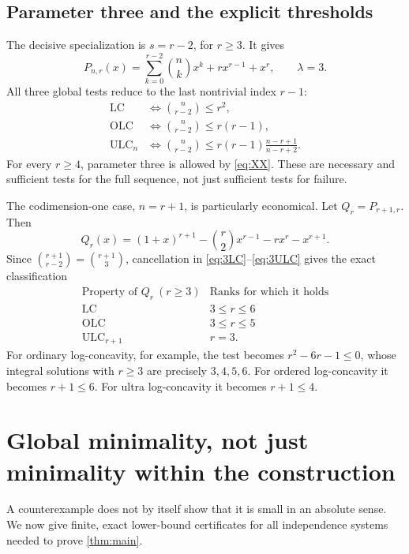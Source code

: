 \documentclass[11pt,letterpaper]{article}
\numberwithin{equation}{section}
\theoremstyle{definition}
\theoremstyle{remark}
\newcommand{\LC}{\mathrm{LC}}
\newcommand{\OLC}{\mathrm{OLC}}
\newcommand{\ULC}{\mathrm{ULC}}
\begin{document}
\subsection{Parameter three and the explicit thresholds}
The decisive specialization is $s=r-2$, for $r\ge3$. It gives
\begin{equation}\label{eq:Pnr}
 P_{n,r}(x)=\sum_{k=0}^{r-2}\binom nk x^k+r x^{r-1}+x^r,
 \qquad \lambda=3.
\end{equation}
All three global tests reduce to the last nontrivial index $r-1$:
\begin{align}
 \LC &\Longleftrightarrow\binom n{r-2}\le r^2,\label{eq:3LC}\\
 \OLC &\Longleftrightarrow\binom n{r-2}\le r(r-1),\label{eq:3OLC}\\
 \ULC_n &\Longleftrightarrow
 \binom n{r-2}\le r(r-1)\frac{n-r+1}{n-r+2}.\label{eq:3ULC}
\end{align}
For every $r\ge4$, parameter three is allowed by \eqref{eq:XX}.
These are necessary and sufficient tests for the full sequence, not just
sufficient tests for failure.

The codimension-one case, $n=r+1$, is particularly economical.
Let $Q_r=P_{r+1,r}$. Then
\begin{equation}\label{eq:Qr}
 Q_r(x)=(1+x)^{r+1}-\binom r2 x^{r-1}-r x^r-x^{r+1}.
\end{equation}
Since $\binom{r+1}{r-2}=\binom{r+1}{3}$, cancellation in
\eqref{eq:3LC}--\eqref{eq:3ULC} gives the exact classification
\begin{equation}\label{eq:codimclass}
 \begin{array}{c|c}
 \text{Property of }Q_r\ (r\ge3)&\text{Ranks for which it holds}\\\hline
 \LC &3\le r\le6\\
 \OLC &3\le r\le5\\
 \ULC_{r+1}&r=3.
 \end{array}
\end{equation}
For ordinary log-concavity, for example, the test becomes
$r^2-6r-1\le0$, whose integral solutions with $r\ge3$ are precisely
$3,4,5,6$. For ordered log-concavity it becomes $r+1\le6$.
For ultra log-concavity it becomes $r+1\le4$.

\section{Global minimality, not just minimality within the construction}
\label{sec:minimality}
A counterexample does not by itself show that it is small in an absolute
sense. We now give finite, exact lower-bound certificates for all
independence systems needed to prove \cref{thm:main}.
\end{document}

